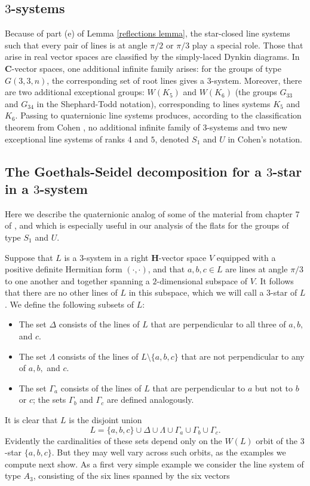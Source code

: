 \documentclass[11pt, reqno]{amsart}
\numberwithin{equation}{section}
\theoremstyle{definition}
\theoremstyle{plain}
\newcommand{\CC}{\mathbf{C}}
\newcommand{\HH}{\mathbf{H}}
\begin{document}
\subsection{$3$-systems} Because of part (e) of Lemma \ref{reflections lemma}, the star-closed line systems such that every pair of lines is at angle $\pi/2$ or $\pi/3$ play a special role. Those that arise in real vector spaces are classified by the simply-laced Dynkin diagrams. In $\CC$-vector spaces, one additional infinite family arises: for the groups of type $G(3,3,n)$, the corresponding set of root lines gives a $3$-system. Moreover, there are two additional exceptional groups: $W(K_5)$ and $W(K_6)$ (the groups $G_{33}$ and $G_{34}$ in the Shephard-Todd notation), corresponding to lines systems $K_5$ and $K_6$. Passing to quaternionic line systems produces, according to the classification theorem from Cohen \cite{Coh}, no additional infinite family of $3$-systems and two new exceptional line systems of ranks $4$ and $5$, denoted $S_1$ and $U$ in Cohen's notation. 


\subsection{The Goethals-Seidel decomposition for a $3$-star in a $3$-system}

Here we describe the quaternionic analog of some of the material from chapter 7 of \cite{LeTa}, and which is especially useful in our analysis of the flats for the groups of type $S_1$ and $U$. 

Suppose that $L$ is a $3$-system in a right $\HH$-vector space $V$ equipped with a positive definite Hermitian form $(\cdot,\cdot)$, and that $a,b,c \in L$ are lines at angle $\pi/3$ to one another and together spanning a $2$-dimensional subspace of $V$. It follows that there are no other lines of $L$ in this subspace, which we will call a $3$-star of $L$. We define the following subsets of $L$:

\begin{itemize}
\item[(a)] The set $\Delta$ consists of the lines of $L$ that are perpendicular to all three of $a,b,$ and $c$. 
\item[(b)] The set $\Lambda$ consists of the lines of $L \setminus \{a,b,c \}$ that are not perpendicular to any of $a,b,$ and $c$.
\item[(c)] The set $\Gamma_a$ consists of the lines of $L$ that are perpendicular to $a$ but not to $b$ or $c$; the sets $\Gamma_b$ and $\Gamma_c$ are defined analogously.
\end{itemize} It is clear that $L$ is the disjoint union $$L=\{a,b,c \} \cup \Delta \cup \Lambda \cup \Gamma_a \cup \Gamma_b \cup \Gamma_c.$$ Evidently the cardinalities of these sets depend only on the $W(L)$ orbit of the $3$-star $\{a,b,c \}$. But they may well vary across such orbits, as the examples we compute next show. As a first very simple example we consider the line system of type $A_3$, consisting of the six lines spanned by the six vectors
\end{document}
